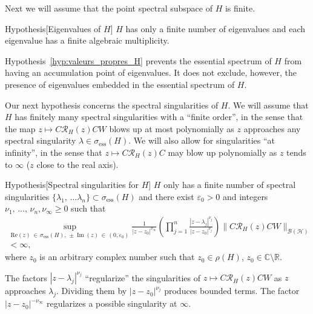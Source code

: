 \documentclass[AHL,Unicode,longabstracts,published]{cedram}
\newcommand{\Hi}{\mathcal{H}}
\newcommand{\bbC}{\mathbb{C}}
\newcommand{\R}{\mathbb{R}}
\newcommand{\ess}{\mathrm{ess}}
\newcommand{\Res}{\mathcal{R}}
\newcommand{\clB}{\mathcal{B}}
\DeclareMathOperator{\im}{Im}
\newcommand*\bbC{\mathbb{C}}
\newcommand{\Hi}{\mathcal{H}}
\newcommand{\R}{\mathbb{R}}
\newcommand{\ess}{\mathrm{ess}}
\DeclareMathOperator{\im}{Im}
\begin{document}
Next we will assume that the point spectral subspace of $H$ is finite.

\begin{enonce}
{Hypothesis}[Eigenvalues of $H$]\label{hyp:valeurs_propres_H}
$H$ has only a finite number of eigenvalues and each eigenvalue has a finite algebraic multiplicity.
\end{enonce}

Hypothesis~\ref{hyp:valeurs_propres_H} prevents the essential spectrum of $H$ from having an accumulation point of eigenvalues. It does not exclude, however, the presence of eigenvalues embedded in the essential spectrum of $H$.



Our next hypothesis concerns the spectral singularities of $H$. We will assume that $H$ has finitely many spectral singularities with a ``finite order'', in the sense that the map $z\mapsto C\Res_H(z)CW$ blows up at most polynomially as $z$ approaches any spectral singularity $\lambda\in\sigma_{\ess}(H)$. We will also allow for singularities ``at infinity'', in the sense that $z\mapsto C\Res_H(z)C$ may blow up polynomially as $z$ tends to $\infty$ ($z$ close to the real axis).

\begin{enonce}
{Hypothesis}[Spectral singularities for $H$]\label{hyp:singularités_spectrales}
$H$ only has a finite number of spectral singularities $\lbrace \lambda_1,\,\ldots\lambda_n\rbrace\subset \sigma_{\ess}(H)$ and there exist $\varepsilon_0>0$ and integers $\nu_1,\,\dots,\,\nu_n,\nu_\infty\ge0$ such that
\begin{multline}\label{eq:limit_uniform}
\sup_{\mathrm{Re}(z)\,\in\,\sigma_{\ess}(H),\,\pm\im(z)\,\in\,(0,\varepsilon_0)} \frac{1}{|z-z_0|^{\nu_\infty}} \left(\prod_{j=1}^n\frac{ |z-\lambda_j|^{\nu_j} }{ |z-z_0|^{\nu_j} } \right) \big\|C\Res_H(z)CW\big\|_{\clB(\Hi)}\\
<\infty,
\end{multline}
where $z_0$ is an arbitrary complex number such that $z_0\in\rho(H)$, $z_0\in\bbC\setminus\R$.
\end{enonce}

The factors $|z-\lambda_j|^{\nu_j}$ ``regularize'' the singularities of $z\mapsto C\Res_H(z)CW$ as $z$ approaches $\lambda_j$. Dividing them by $|z-z_0|^{\nu_j}$ produces bounded terms. The factor $|z-z_0|^{-\nu_\infty}$ regularizes a possible singularity at $\infty$.
\end{document}
